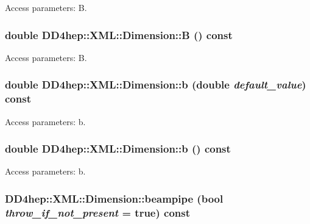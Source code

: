 Access parameters: B. \hypertarget{struct_d_d4hep_1_1_x_m_l_1_1_dimension_a37fade207b62696767d96e141218af65}{
\subsubsection[{B}]{\setlength{\rightskip}{0pt plus 5cm}double DD4hep::XML::Dimension::B () const}}
\label{struct_d_d4hep_1_1_x_m_l_1_1_dimension_a37fade207b62696767d96e141218af65}


Access parameters: B. \hypertarget{struct_d_d4hep_1_1_x_m_l_1_1_dimension_ad019dd23493fbe818fa17a469ea00add}{
\subsubsection[{b}]{\setlength{\rightskip}{0pt plus 5cm}double DD4hep::XML::Dimension::b (double {\em default\_\-value}) const}}
\label{struct_d_d4hep_1_1_x_m_l_1_1_dimension_ad019dd23493fbe818fa17a469ea00add}


Access parameters: b. \hypertarget{struct_d_d4hep_1_1_x_m_l_1_1_dimension_a541c93dbfa23648d7a1d1b94be2547f7}{
\subsubsection[{b}]{\setlength{\rightskip}{0pt plus 5cm}double DD4hep::XML::Dimension::b () const}}
\label{struct_d_d4hep_1_1_x_m_l_1_1_dimension_a541c93dbfa23648d7a1d1b94be2547f7}


Access parameters: b. \hypertarget{struct_d_d4hep_1_1_x_m_l_1_1_dimension_a9c2eabfa96db3c9ed090a7e955851d16}{
\subsubsection[{beampipe}]{ DD4hep::XML::Dimension::beampipe (bool {\em throw\_\-if\_\-not\_\-present} = {\ttfamily true}) const}}
\label{struct_d_d4hep_1_1_x_m_l_1_1_dimension_a9c2eabfa96db3c9ed090a7e955851d16}


